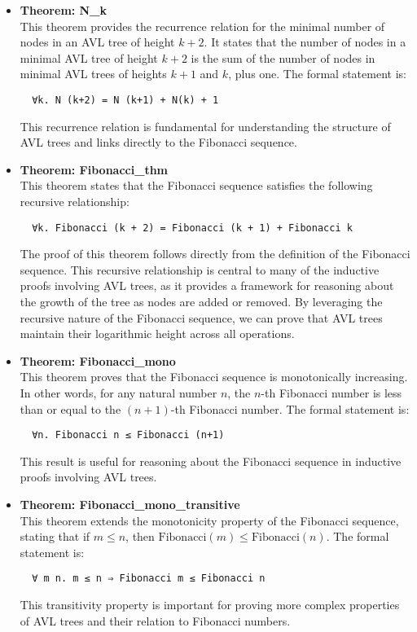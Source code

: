 \documentclass[12pt]{article}
\begin{document}
\begin{itemize}
\item \textbf{Theorem: N\_k} \\
  This theorem provides the recurrence relation for the minimal number of nodes in an AVL tree of height \( k+2 \). It states that the number of nodes in a minimal AVL tree of height \( k+2 \) is the sum of the number of nodes in minimal AVL trees of heights \( k+1 \) and \( k \), plus one. The formal statement is:
  \begin{verbatim}
  ∀k. N (k+2) = N (k+1) + N(k) + 1
  \end{verbatim}
  This recurrence relation is fundamental for understanding the structure of AVL trees and links directly to the Fibonacci sequence.

  \item \textbf{Theorem: Fibonacci\_thm} \\
  This theorem states that the Fibonacci sequence satisfies the following recursive relationship:
  \begin{verbatim}
  ∀k. Fibonacci (k + 2) = Fibonacci (k + 1) + Fibonacci k
  \end{verbatim}
  
  The proof of this theorem follows directly from the definition of the Fibonacci sequence. This recursive relationship is central to many of the inductive proofs involving AVL trees, as it provides a framework for reasoning about the growth of the tree as nodes are added or removed. By leveraging the recursive nature of the Fibonacci sequence, we can prove that AVL trees maintain their logarithmic height across all operations.

\item \textbf{Theorem: Fibonacci\_mono} \\
  This theorem proves that the Fibonacci sequence is monotonically increasing. In other words, for any natural number \( n \), the \( n \)-th Fibonacci number is less than or equal to the \( (n+1) \)-th Fibonacci number. The formal statement is:
  \begin{verbatim}
  ∀n. Fibonacci n ≤ Fibonacci (n+1)
  \end{verbatim}
  This result is useful for reasoning about the Fibonacci sequence in inductive proofs involving AVL trees.

\item \textbf{Theorem: Fibonacci\_mono\_transitive} \\
  This theorem extends the monotonicity property of the Fibonacci sequence, stating that if \( m \leq n \), then \( \text{Fibonacci}(m) \leq \text{Fibonacci}(n) \). The formal statement is:
  \begin{verbatim}
  ∀ m n. m ≤ n ⇒ Fibonacci m ≤ Fibonacci n
  \end{verbatim}
  This transitivity property is important for proving more complex properties of AVL trees and their relation to Fibonacci numbers.
  

\end{itemize}
\end{document}
